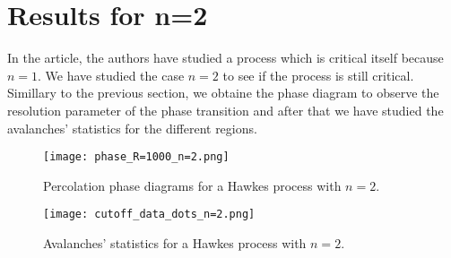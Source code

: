 \section{Results for n=2}

In the article, the authors have studied a process which is critical itself because $n=1$. We have studied the case $n=2$ to see if the process is still critical. Simillary to the 
previous section, we obtaine the phase diagram to observe the resolution parameter of the phase transition and after that we have studied the avalanches' statistics for the different
regions.

\begin{figure}[H]
    \centering
    \texttt{[image: phase\_R=1000\_n=2.png]}
    \caption{Percolation phase diagrams for a Hawkes process with $n=2$.}
    \label{f:phase_diagram_n=2}
\end{figure}

\begin{figure}[H]
    \centering
    \texttt{[image: cutoff\_data\_dots\_n=2.png]}
    \caption{Avalanches' statistics for a Hawkes process with $n=2$.}
    \label{f:avalanches_n=2}
\end{figure}